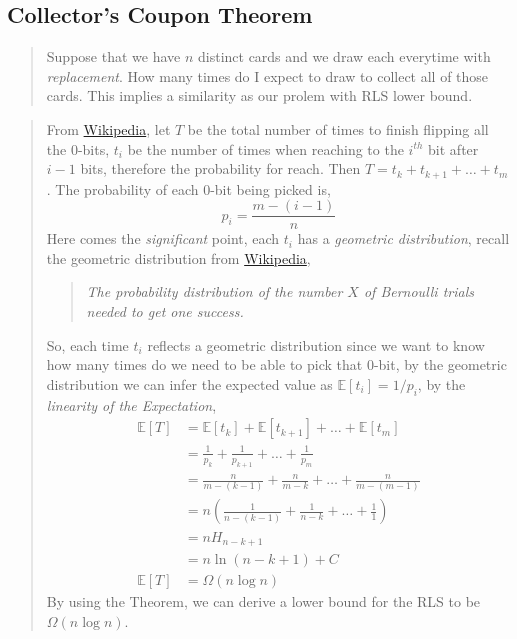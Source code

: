 \documentclass[a4paper, 12pt]{article}
\begin{document}
        \subsection{Collector's Coupon Theorem}
            \begin{quote}
                Suppose that we have $n$ distinct cards and we draw each everytime with \emph{replacement}. How many times do I expect to draw to collect all 
                of those cards. This implies a similarity as our prolem with RLS lower bound. 
            \end{quote}
            \begin{quote}
                From \href{https://en.wikipedia.org/wiki/Coupon_collector%27s_problem}{Wikipedia}, let $T$ be the total number of times to finish flipping 
                all the 0-bits, $t_i$ be the number of times when reaching to the $i^{th}$ bit after $i - 1$ bits, therefore the probability for reach. Then 
                $T = t_{k} + t_{k+1} + \ldots + t_m$. The probability of each 0-bit being picked is,
                \begin{equation*}
                    p_i = \frac{m - (i - 1)}{n}
                \end{equation*}
                Here comes the \emph{significant} point, each $t_i$ has a \emph{geometric distribution}, recall the geometric distribution from
                \href{https://en.wikipedia.org/wiki/Geometric_distribution}{Wikipedia},
                \begin{quote}
                    \itshape The probability distribution of the number $X$ of Bernoulli trials needed to get one success. 
                \end{quote}
                So, each time $t_i$ reflects a geometric distribution since we want to know how many times do we need to be able to pick that 0-bit,
                by the geometric distribution we can infer the expected value as $\mathbb{E}[t_i] = 1/p_i$, by the \emph{linearity of the Expectation},
                \begin{align*}
                    \mathbb{E}[T] &= \mathbb{E}[t_k] + \mathbb{E}[t_{k+1}] + \ldots + \mathbb{E}[t_{m}]\\
                    &= \frac{1}{p_k} + \frac{1}{p_{k+1}} +\ldots + \frac{1}{p_m}\\
                    &= \frac{n}{m-(k-1)} + \frac{n}{m-k}+\ldots+\frac{n}{m-(m-1)}\\
                    &= n\left(\frac{1}{n-(k-1)} + \frac{1}{n-k}+\ldots+\frac{1}{1}\right)\\
                    &= nH_{n-k+1}\\
                    &= n\ln(n-k+1) + C\\
                    \mathbb{E}[T]&=\Omega(n\log n)
                \end{align*}
                By using the Theorem, we can derive a lower bound for the RLS to be $\Omega(n\log n)$.
            \end{quote}
\end{document}
